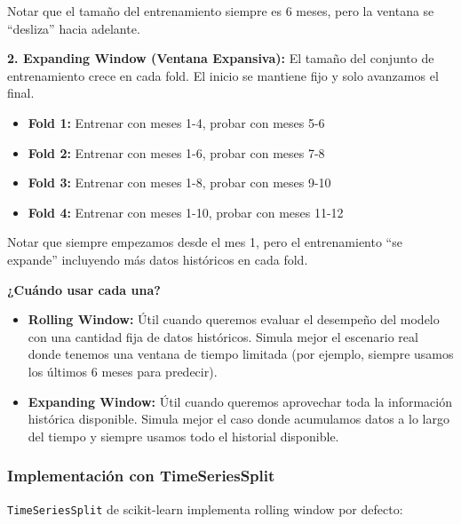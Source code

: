 \documentclass[12pt]{article}
\begin{document}
Notar que el tamaño del entrenamiento siempre es 6 meses, pero la ventana se ``desliza'' hacia adelante.

\vspace{0.5em}

\textbf{2. Expanding Window (Ventana Expansiva):} El tamaño del conjunto de entrenamiento crece en cada fold. El inicio se mantiene fijo y solo avanzamos el final.

\begin{itemize}
    \item \textbf{Fold 1:} Entrenar con meses 1-4, probar con meses 5-6
    \item \textbf{Fold 2:} Entrenar con meses 1-6, probar con meses 7-8
    \item \textbf{Fold 3:} Entrenar con meses 1-8, probar con meses 9-10
    \item \textbf{Fold 4:} Entrenar con meses 1-10, probar con meses 11-12
\end{itemize}

Notar que siempre empezamos desde el mes 1, pero el entrenamiento ``se expande'' incluyendo más datos históricos en cada fold.

\vspace{0.5em}

\textbf{¿Cuándo usar cada una?}
\begin{itemize}
    \item \textbf{Rolling Window:} Útil cuando queremos evaluar el desempeño del modelo con una cantidad fija de datos históricos. Simula mejor el escenario real donde tenemos una ventana de tiempo limitada (por ejemplo, siempre usamos los últimos 6 meses para predecir).
    \item \textbf{Expanding Window:} Útil cuando queremos aprovechar toda la información histórica disponible. Simula mejor el caso donde acumulamos datos a lo largo del tiempo y siempre usamos todo el historial disponible.
\end{itemize}

\subsubsection{Implementación con TimeSeriesSplit}

\texttt{TimeSeriesSplit} de scikit-learn implementa rolling window por defecto:
\end{document}
